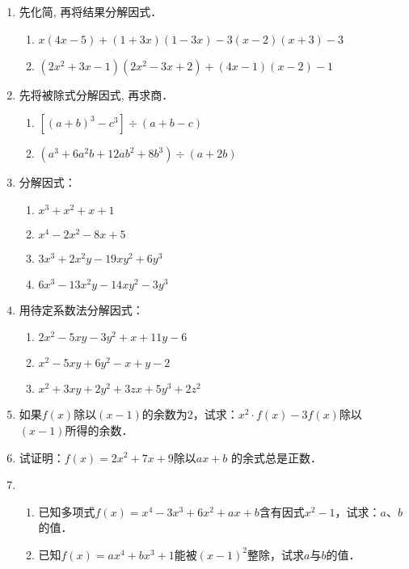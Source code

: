 \begin{enumerate}
\item 先化简, 再将结果分解因式．
\begin{enumerate}
    \item  $x(4 x-5)+(1+3 x)(1-3 x)-3(x-2)(x+3)-3$
\item  $\left(2 x^{2}+3 x-1\right)\left(2 x^{2}-3 x+2\right)+(4 x-1)(x-2)-1$
\end{enumerate}

\item 先将被除式分解因式, 再求商．
\begin{enumerate}
    \item $\left[(a+b)^{3}-c^{3}\right]\div (a+b-c)$
    \item $\left(a^{3}+6 a^{2} b+12 a b^{2}+8 b^{3}\right)\div (a+2 b)$
\end{enumerate}

\item 分解因式：
\begin{multicols}{2}
\begin{enumerate}
    \item $x^{3}+x^{2}+x+1$
\item $x^{4}-2 x^{2}-8 x+5$ 
\item $3 x^{3}+2 x^{2} y-19 x {y}^{2}+6 y^{3}$
\item $6 x^{3}-13 x^{2} y-14 x y^{2}-3 y^{3}$
\end{enumerate}
\end{multicols}
\item 用待定系数法分解因式：
\begin{enumerate}
\item $2 x^{2}-5 x y-3 y^{2}+x+11 y-6$
\item $x^{2}-5 x y+6 y^{2}-x+y-2 $
\item $x^{2}+3 x y+2 y^{2}+3 z x+5 y^{3}+2 z^{2}$
\end{enumerate}


\item 如果$f(x)$除以$(x-1)$的余数为2，试求：$x^2\cdot f(x)-3f(x)$除以$(x-1)$所得的余数．

\item 试证明：$f(x)=2x^2+7x+9$除以$ax+b$ 的余式总是正数．
\item 
\begin{enumerate}
\item 已知多项式$f(x)=x^4-3x^3+6x^2+ax+b$含有因式$x^2-1$，试求：$a$、$b$的值．
\item 已知$f(x)=ax^4+bx^3+1$能被$(x-1)^2$整除，试求$a$与$b$的值．
\end{enumerate}


\end{enumerate}
